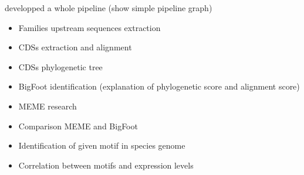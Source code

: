 developped a whole pipeline (show simple pipeline graph)
\begin{itemize}
\item Families upstream sequences extraction
\item CDSs extraction and alignment
\item CDSs phylogenetic tree
\item BigFoot identification (explanation of phylogenetic score and alignment score)
\item MEME research
\item Comparison MEME and BigFoot
\item Identification of given motif in species genome
\item Correlation between motifs and expression levels
\end{itemize}
